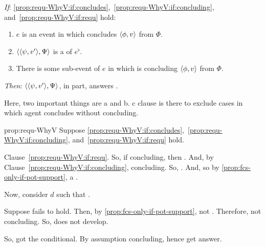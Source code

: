 \begin{note}
 \begin{proposition}
    \label{prop:requ-WhyV}

    \begin{itenum}
    \item[\emph{If}:]
      \ref{prop:requ-WhyV:if:concludes},~\ref{prop:requ-WhyV:if:concluding}, and~\ref{prop:requ-WhyV:if:requ} hold:
      \begin{enumerate}[label=\arabic*., ref=(\arabic*), series=propRequWhyVSeries]
      \item
        \label{prop:requ-WhyV:if:concludes}
        \(e\) is an event in which \vAgent{} concludes \(\langle \phi, v \rangle\) from \(\Phi\).
      \item
        \label{prop:requ-WhyV:if:requ}
        \(\langle \langle \psi, v' \rangle, \Psi \rangle\) is a \requ{} of \(e^{\flat}\).
      \item
        \label{prop:requ-WhyV:if:concluding}
        There is some sub-event of \(e\) in which \vAgent{} is concluding \(\langle \phi, v \rangle\) from \(\Phi\).
      \end{enumerate}
    \item[\emph{Then}:]
        \(\langle \langle \psi, v' \rangle, \Psi \rangle\), in part, answers \qWhyV{}.
    \end{itenum}
    \vspace{-\baselineskip}
  \end{proposition}

  Here, two important things are a and b.
  c clause is there to exclude cases in which agent concludes without concluding.

  \begin{argument}{prop:requ-WhyV}
    Suppose \ref{prop:requ-WhyV:if:concludes},~\ref{prop:requ-WhyV:if:concluding}, and~\ref{prop:requ-WhyV:if:requ} hold.


    Clause~\ref{prop:requ-WhyV:if:requ}.
    So, if concluding, then \fc{}.
    And, by Clause~\ref{prop:requ-WhyV:if:concluding}, concluding.
    So, \fc{}.
    And, so by \autoref{prop:fcs-only-if-pot-support}, a \ros{}.

    Now, consider \(d\) such that \requ{}.

    Suppose \ros{} fails to hold.
    Then, by \autoref{prop:fcs-only-if-pot-support}, not \fc{}.
    Therefore, not concluding.
    So, does not develop.

    So, got the conditional.
    By assumption concluding, hence get answer.
  \end{argument}
\end{note}


